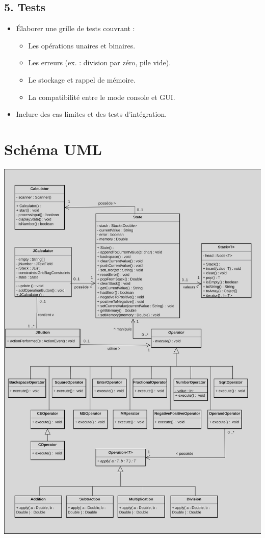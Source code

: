 \documentclass[12pt]{report}
\begin{document}
            \subsection*{5. Tests}
                \begin{itemize}
                    \item Élaborer une grille de tests couvrant :
                    \begin{itemize}
                        \item Les opérations unaires et binaires.
                        \item Les erreurs (ex. : division par zéro, pile vide).
                        \item Le stockage et rappel de mémoire.
                        \item La compatibilité entre le mode console et GUI.
                    \end{itemize}

                    \item Inclure des cas limites et des tests d'intégration.
                \end{itemize}
    \section*{Schéma UML}
    \includegraphics[scale=0.3]{images/diagram}
\end{document}
